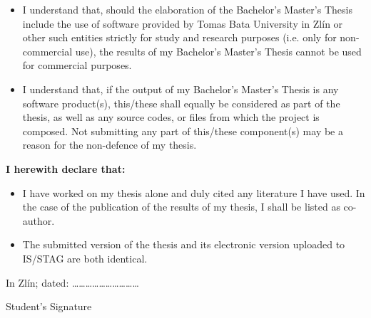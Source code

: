{{\begin{itemize}
						\item{I understand that, should the elaboration of the \ifbp Bachelor's \else\ifdp Master's \fi\fi Thesis include the use of software provided by Tomas Bata University in Zlín or other such entities strictly for study and research purposes (i.e. only for non-commercial use), the results of my \ifbp Bachelor's \else\ifdp Master's \fi\fi Thesis cannot be used for commercial purposes.}
						\item{I understand that, if the output of my \ifbp Bachelor's \else\ifdp Master's \fi\fi Thesis is any software product(s), this/these shall equally be considered as part of the thesis, as well as any source codes, or files from which the project is composed. Not submitting any part of this/these component(s) may be a reason for the non-defence of my thesis.}
					\end{itemize}
					\medskip
					\textbf{I herewith declare that:}
					\begin{itemize}
						\setlength{\parskip}{0pt}
						\setlength{\itemsep}{0pt}
						\item{I have worked on my thesis alone and duly cited any literature I have used. In the case of the publication of the results of my thesis, I shall be listed as co-author.}
						\item{The submitted version of the thesis and its electronic version uploaded to IS/STAG are both identical.}
					\end{itemize}
					\medskip
					In Zlín; dated: \hspace{6.5cm}\dots\dots\dots\dots\dots\dots\dots\dots\dots\dots

					\hspace{10.3cm}Student's Signature

				\fi \fi
		}}


